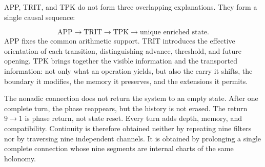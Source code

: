APP, TRIT, and TPK do not form three overlapping explanations. They form a single causal sequence:\par
\[
\mathrm{APP}
\longrightarrow
\mathrm{TRIT}
\longrightarrow
\mathrm{TPK}
\longrightarrow
\text{unique enriched state}.
\]
APP fixes the common arithmetic support. TRIT introduces the effective orientation of each transition, distinguishing advance, threshold, and future opening. TPK brings together the visible information and the transported information: not only what an operation yields, but also the carry it shifts, the boundary it modifies, the memory it preserves, and the extensions it permits.\par
The nonadic connection does not return the system to an empty state. After one complete turn, the phase reappears, but the history is not erased. The return \(9\to1\) is phase return, not state reset. Every turn adds depth, memory, and compatibility. Continuity is therefore obtained neither by repeating nine filters nor by traversing nine independent channels. It is obtained by prolonging a single complete connection whose nine segments are internal charts of the same holonomy.\par
{}
